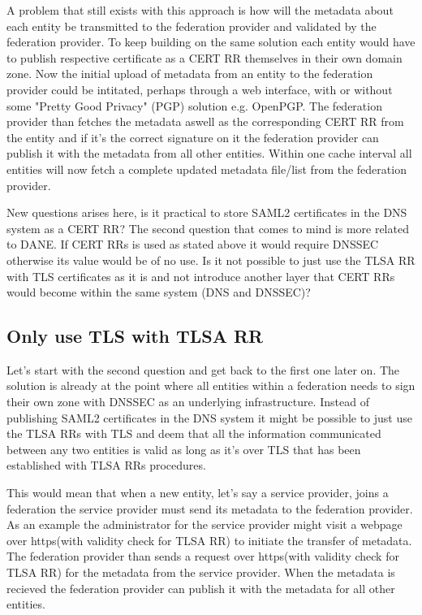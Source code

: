 A problem that still exists with this approach is how will the metadata about each entity be transmitted to the federation provider and validated by the federation provider.
To keep building on the same solution each entity would have to publish respective certificate as a CERT RR themselves in their own domain zone.
Now the initial upload of metadata from an entity to the federation provider could be intitated, perhaps through a web interface, with or without some "Pretty Good Privacy" (PGP) solution e.g. OpenPGP\cite{rfc:5011}.
The federation provider than fetches the metadata aswell as the corresponding CERT RR from the entity and if it's the correct signature on it the federation provider can publish it with the metadata from all other entities.
Within one cache interval all entities will now fetch a complete updated metadata file/list from the federation provider.


New questions arises here, is it practical to store SAML2 certificates in the DNS system as a CERT RR?
The second question that comes to mind is more related to DANE.
If CERT RRs is used as stated above it would require DNSSEC otherwise its value would be of no use.
Is it not possible to just use the TLSA RR with TLS certificates as it is and not introduce another layer that CERT RRs would become within the same system (DNS and DNSSEC)?

\subsection{Only use TLS with TLSA RR}
\label{subsec:only-tlsa-rr-with-tls}
Let's start with the second question and get back to the first one later on.
The solution is already at the point where all entities within a federation needs to sign their own zone with DNSSEC as an underlying infrastructure.
Instead of publishing SAML2 certificates in the DNS system it might be possible to just use the TLSA RRs with TLS and deem that all the information communicated between any two entities is valid as long as it's over TLS that has been established with TLSA RRs procedures.

This would mean that when a new entity, let's say a service provider, joins a federation the service provider must send its metadata to the federation provider.
As an example the administrator for the service provider might visit a webpage over https(with validity check for TLSA RR) to initiate the transfer of metadata.
The federation provider than sends a request over https(with validity check for TLSA RR) for the metadata from the service provider.
When the metadata is recieved the federation provider can publish it with the metadata for all other entities.

